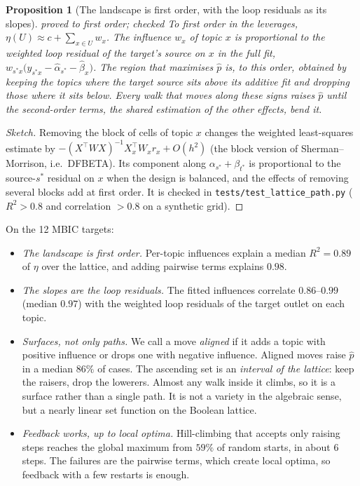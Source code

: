 \documentclass[11pt]{article}
\newtheorem{proposition}[theorem]{Proposition}
\theoremstyle{definition}
\theoremstyle{remark}
\newcommand{\st}[1]{\textsf{\small\color{gray}#1}}
\begin{document}
\begin{proposition}[The landscape is first order, with the loop residuals as its slopes]\label{prop:landscape}\st{proved to first order; checked}
To first order in the leverages, $\eta(U)\approx c+\sum_{x\in U}w_x$. The influence $w_x$ of topic $x$ is proportional to the weighted loop residual of the target's source on $x$ in the full fit, $w_{s^*x}\bigl(y_{s^*x}-\hat\alpha_{s^*}-\hat\beta_x\bigr)$. The region that maximises $\hat p$ is, to this order, obtained by keeping the topics where the target source sits above its additive fit and dropping those where it sits below. Every walk that moves along these signs raises $\hat p$ until the second-order terms, the shared estimation of the other effects, bend it.
\end{proposition}
\begin{proof}[Sketch]
Removing the block of cells of topic $x$ changes the weighted least-squares estimate by $-(X^\top WX)^{-1}X_x^\top W_xr_x+O(h^2)$ (the block version of Sherman--Morrison, i.e.\ DFBETA). Its component along $\alpha_{s^*}+\beta_{t^*}$ is proportional to the source-$s^*$ residual on $x$ when the design is balanced, and the effects of removing several blocks add at first order. It is checked in \texttt{tests/test\_lattice\_path.py} ($R^2>0.8$ and correlation $>0.8$ on a synthetic grid).
\end{proof}
\noindent On the 12 MBIC targets:
\begin{itemize}
  \item \emph{The landscape is first order.} Per-topic influences explain a median $R^2=0.89$ of $\eta$ over the lattice, and adding pairwise terms explains $0.98$.
  \item \emph{The slopes are the loop residuals.} The fitted influences correlate $0.86$--$0.99$ (median $0.97$) with the weighted loop residuals of the target outlet on each topic.
  \item \emph{Surfaces, not only paths.} We call a move \emph{aligned} if it adds a topic with positive influence or drops one with negative influence. Aligned moves raise $\hat p$ in a median $86\%$ of cases. The ascending set is an \emph{interval of the lattice}: keep the raisers, drop the lowerers. Almost any walk inside it climbs, so it is a surface rather than a single path. It is not a variety in the algebraic sense, but a nearly linear set function on the Boolean lattice.
  \item \emph{Feedback works, up to local optima.} Hill-climbing that accepts only raising steps reaches the global maximum from $59\%$ of random starts, in about 6 steps. The failures are the pairwise terms, which create local optima, so feedback with a few restarts is enough.
\end{itemize}
\end{document}
